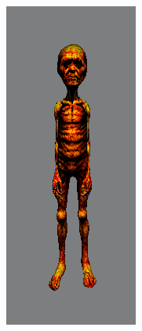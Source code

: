 \begin{figure}[ht]
\begin{subfigure}[b]{0.12\textwidth}
        \caption{}
    \end{subfigure}
    \begin{subfigure}[b]{0.118\textwidth}
        \centering
        \includegraphics[width=\textwidth]{etc/bias/bias_poor_magic3d_part1.png}

\end{subfigure}
\end{figure}
